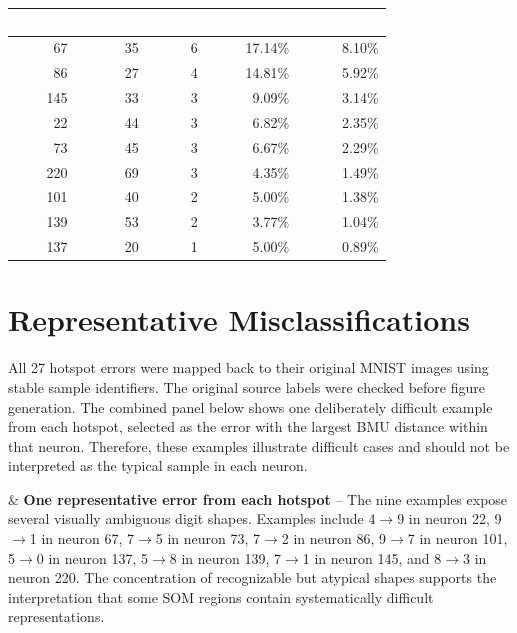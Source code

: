 \documentclass[11pt]{article}
\begin{document}
\begin{table}[H]
\centering
\small
\begin{tabular}{|r|r|r|r|r|}
\hline
\rowcolor{TableHeader}
\textcolor{white}{\textbf{Neuron}} & \textcolor{white}{\textbf{Support}} & \textcolor{white}{\textbf{Errors}} & \textcolor{white}{\textbf{Error Rate}} & \textcolor{white}{\textbf{Wilson LB}} \\
\hline
67 & 35 & 6 & 17.14\% & 8.10\% \\
86 & 27 & 4 & 14.81\% & 5.92\% \\
145 & 33 & 3 & 9.09\% & 3.14\% \\
22 & 44 & 3 & 6.82\% & 2.35\% \\
73 & 45 & 3 & 6.67\% & 2.29\% \\
220 & 69 & 3 & 4.35\% & 1.49\% \\
101 & 40 & 2 & 5.00\% & 1.38\% \\
139 & 53 & 2 & 3.77\% & 1.04\% \\
137 & 20 & 1 & 5.00\% & 0.89\% \\
\hline
\end{tabular}
\end{table}

\section{Representative Misclassifications}
All 27 hotspot errors were mapped back to their original MNIST images using stable sample identifiers. The original source labels were checked before figure generation. The combined panel below shows one deliberately difficult example from each hotspot, selected as the error with the largest BMU distance within that neuron. Therefore, these examples illustrate difficult cases and should not be interpreted as the typical sample in each neuron.

\resulttablebegin
{} &
\textbf{One representative error from each hotspot} -- The nine examples expose several visually ambiguous digit shapes. Examples include 4$\rightarrow$9 in neuron 22, 9$\rightarrow$1 in neuron 67, 7$\rightarrow$5 in neuron 73, 7$\rightarrow$2 in neuron 86, 9$\rightarrow$7 in neuron 101, 5$\rightarrow$0 in neuron 137, 5$\rightarrow$8 in neuron 139, 7$\rightarrow$1 in neuron 145, and 8$\rightarrow$3 in neuron 220. The concentration of recognizable but atypical shapes supports the interpretation that some SOM regions contain systematically difficult representations. \\
\hline
\resulttableend
\end{document}
